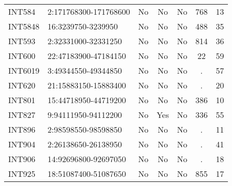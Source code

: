 \begin{longtable}{llccccc}
INT584 & 2:171768300-171768600 & No & No & No & 768 & 13 \\
INT5848 & 16:3239750-3239950 & No & No & No & 488 & 35 \\
INT593 & 2:32331000-32331250 & No & No & No & 814 & 36 \\
INT600 & 22:47183900-47184150 & No & No & No & 22 & 59 \\
INT6019 & 3:49344550-49344850 & No & No & No & . & 57 \\
INT620 & 21:15883150-15883400 & No & No & No & . & 20 \\
INT801 & 15:44718950-44719200 & No & No & No & 386 & 10 \\
INT827 & 9:94111950-94112200 & No & Yes & No & 336 & 55 \\
INT896 & 2:98598550-98598850 & No & No & No & . & 11 \\
INT904 & 2:26138650-26138950 & No & No & No & . & 41 \\
INT906 & 14:92696800-92697050 & No & No & No & . & 18 \\
INT925 & 18:51087400-51087650 & No & No & No & 855 & 17 \\





\end{longtable}
